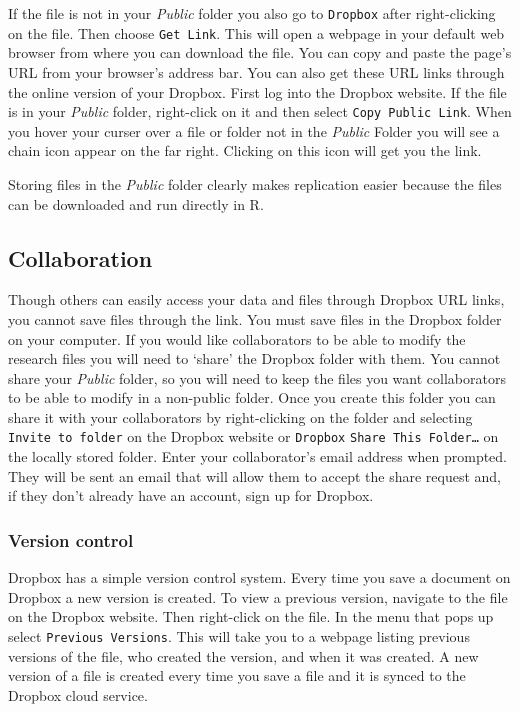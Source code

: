If the file is not in your \emph{Public} folder you also go to \texttt{Dropbox} after right-clicking on the file. Then choose \texttt{Get Link}. This will open a webpage in your default web browser from where you can download the file. You can copy and paste the page's URL from your browser's address bar. You can also get these URL links through the online version of your Dropbox. First log into the Dropbox website. If the file is in your \emph{Public} folder, right-click on it and then select \texttt{Copy Public Link}. When you hover your curser over a file or folder not in the \emph{Public} Folder you will see a chain icon appear on the far right. Clicking on this icon will get you the link.

Storing files in the \emph{Public} folder clearly makes replication easier because the files can be downloaded and run directly in R.

\subsection{Collaboration}

Though others can easily access your data and files through Dropbox URL links, you cannot save files through the link. You must save files in the Dropbox folder on your computer. If you would like collaborators to be able to modify the research files you will need to `share' the Dropbox folder with them. You cannot share your \emph{Public} folder, so you will need to keep the files you want collaborators to be able to modify in a non-public folder. Once you create this folder you can share it with your collaborators by right-clicking on the folder and selecting \texttt{Invite to folder} on the Dropbox website or \texttt{Dropbox} \textrightarrow \texttt{Share This Folder\ldots} on the locally stored folder. Enter your collaborator's email address when prompted. They will be sent an email that will allow them to accept the share request and, if they don't already have an account, sign up for Dropbox.

\subsubsection{Version control}

Dropbox has a simple version control system. Every time you save a document on Dropbox a new version is created. To view a previous version, navigate to the file on the Dropbox website. Then right-click on the file. In the menu that pops up select \texttt{Previous Versions}. This will take you to a webpage listing previous versions of the file, who created the version, and when it was created. A new version of a file is created every time you save a file and it is synced to the Dropbox cloud service. 


